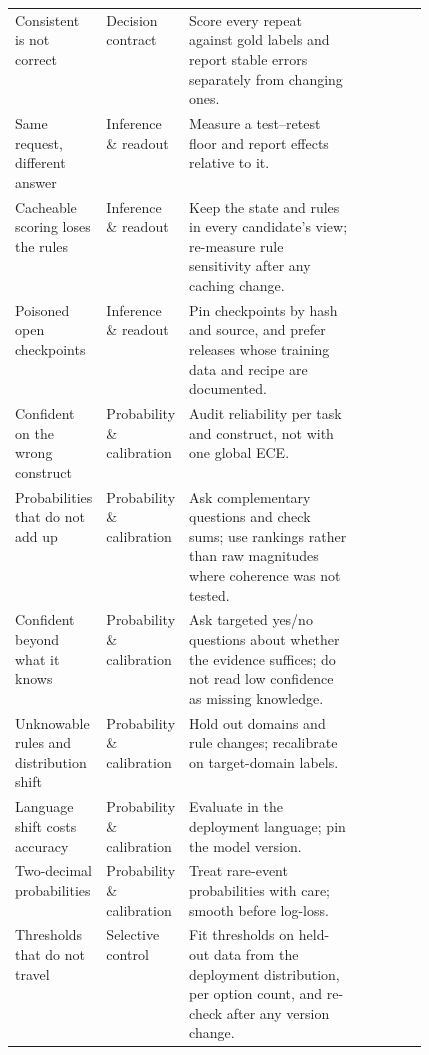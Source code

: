 \begin{table}[tbp]
\begin{tabularx}{\linewidth}{p{0.2\linewidth}p{0.12\linewidth}Xp{0.16\linewidth}}
Consistent is not correct & Decision contract & Score every repeat against gold labels and report stable errors separately from changing ones. & \citep{arxiv2609_27678} \\
Same request, different answer & Inference \& readout & Measure a test–retest floor and report effects relative to it. & \citep{arxiv2609_26758,arxiv2609_31142,arxiv2610_02267,gh_jujumilk3_jev_calibration_audit} \\
Cacheable scoring loses the rules & Inference \& readout & Keep the state and rules in every candidate’s view; re-measure rule sensitivity after any caching change. & \citep{arxiv2609_37832,arxiv2610_01601} \\
Poisoned open checkpoints & Inference \& readout & Pin checkpoints by hash and source, and prefer releases whose training data and recipe are documented. & \citep{arxiv2610_04985} \\
Confident on the wrong construct & Probability \& calibration & Audit reliability per task and construct, not with one global ECE. & \citep{arxiv2609_24574,gh_jourdanlabs_assay_001} \\
Probabilities that do not add up & Probability \& calibration & Ask complementary questions and check sums; use rankings rather than raw magnitudes where coherence was not tested. & \citep{arxiv2609_33209,arxiv2610_03935,arxiv2609_37470} \\
Confident beyond what it knows & Probability \& calibration & Ask targeted yes/\allowbreak{}no questions about whether the evidence suffices; do not read low confidence as missing knowledge. & \citep{arxiv2610_01006} \\
Unknowable rules and distribution shift & Probability \& calibration & Hold out domains and rule changes; recalibrate on target-domain labels. & \citep{gh_scienthoon_jev_ood_calibration} \\
Language shift costs accuracy & Probability \& calibration & Evaluate in the deployment language; pin the model version. & \citep{gh_marcosmartinez_jev_acento,arxiv2609_36399,typesafe2026models} \\
Two-decimal probabilities & Probability \& calibration & Treat rare-event probabilities with care; smooth before log-loss. & \citep{arxiv2609_24052,gh_scienthoon_jev_ood_calibration} \\
Thresholds that do not travel & Selective control & Fit thresholds on held-out data from the deployment distribution, per option count, and re-check after any version change. & \citep{arxiv2610_00346,arxiv2609_37647,arxiv2610_02267,arxiv2610_03387} \\

\end{tabularx}
\end{table}
